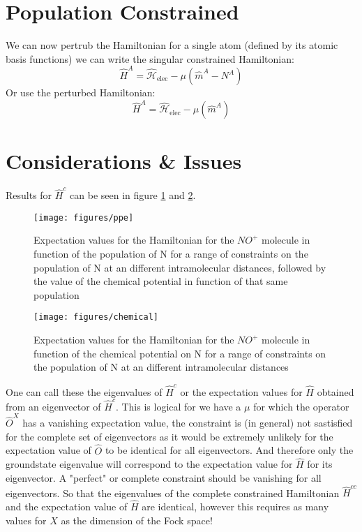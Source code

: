 \section{Population Constrained}
  We can now pertrub the Hamiltonian for a single atom (defined by its atomic basis functions) we can write the singular constrained Hamiltonian:
  \begin{equation}\label{eq:constrained_atom_A}
    \hat{{H}}^{A} = \hat{\mathcal{H}}_\text{elec} - \mu (\hat{m}^{A} - N^A)
  \end{equation}
  Or use the perturbed Hamiltonian:
  \begin{equation}\label{eq:perturbed_atom_A}
    \hat{{H}}^{A} = \hat{\mathcal{H}}_\text{elec} - \mu (\hat{m}^{A})
  \end{equation}

\section{Considerations \& Issues}

 Results for $\hat{H}^c$ can be seen in figure \ref{fig:res1} and \ref{fig:res2}.

 \begin{figure}[h!]
   \texttt{[image: figures/ppe]}
   \caption{Expectation values for the Hamiltonian for the $NO^+$ molecule in function of the population of N for a range of constraints on the population of N at an different intramolecular distances, followed by the value of the chemical potential in function of that same population}
   \label{fig:res1}
 \end{figure}


  \begin{figure}[h!]
    \texttt{[image: figures/chemical]}
    \caption{Expectation values for the Hamiltonian for the $NO^+$ molecule in function of the chemical potential on N for a range of constraints on the population of N at an different intramolecular distances}
    \label{fig:res2}
  \end{figure}

  One can call these the eigenvalues of $\hat{H}^c$ or the expectation values for $\hat{H}$ obtained from an eigenvector of $\hat{H}^c$. This is logical for we have a $\mu$ for which the operator $\hat{O}^X$ has a vanishing expectation value, the constraint is (in general) not sastisfied for the complete set of eigenvectors as it would be extremely unlikely for the expectation value of $\hat{O}$ to be identical for all eigenvectors. And therefore only the groundstate eigenvalue will correspond to the expectation value for $\hat{H}$ for its eigenvector. A "perfect" or complete constraint should be vanishing for all eigenvectors. So that the eigenvalues of the complete constrained Hamiltonian $\hat{H}^{cc}$ and the expectation value of $\hat{H}$ are identical, however this requires as many values for $X$ as the dimension of the Fock space!

